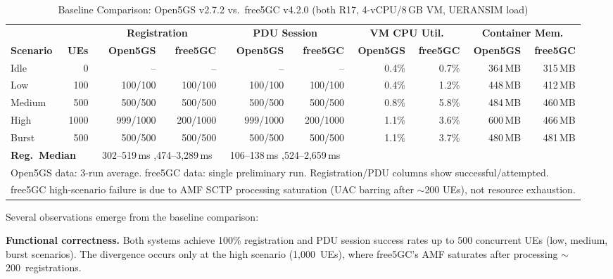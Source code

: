 \documentclass[conference]{IEEEtran}
\begin{document}
\begin{table}[t]
\centering
\caption{Baseline Comparison: Open5GS v2.7.2 vs.\ free5GC v4.2.0 (both R17, 4-vCPU/8\,GB VM, UERANSIM load)}
\label{tab:baseline-resources}
\footnotesize
\begin{tabular}{@{}l r rr rr rr rr@{}}
\toprule
 & & \multicolumn{2}{c}{\textbf{Registration}} & \multicolumn{2}{c}{\textbf{PDU Session}} & \multicolumn{2}{c}{\textbf{VM CPU Util.}} & \multicolumn{2}{c}{\textbf{Container Mem.}} \\
\cmidrule(lr){3-4} \cmidrule(lr){5-6} \cmidrule(lr){7-8} \cmidrule(lr){9-10}
\textbf{Scenario} & \textbf{UEs} & \textbf{Open5GS} & \textbf{free5GC} & \textbf{Open5GS} & \textbf{free5GC} & \textbf{Open5GS} & \textbf{free5GC} & \textbf{Open5GS} & \textbf{free5GC} \\
\midrule
Idle   & 0    & --         & --         & --         & --         & 0.4\%  & 0.7\%  & 364\,MB  & 315\,MB  \\
Low    & 100  & 100/100    & 100/100    & 100/100    & 100/100    & 0.4\%  & 1.2\%  & 448\,MB  & 412\,MB  \\
Medium & 500  & 500/500    & 500/500    & 500/500    & 500/500    & 0.8\%  & 5.8\%  & 484\,MB  & 460\,MB  \\
High   & 1000 & 999/1000   & 200/1000   & 999/1000   & 200/1000   & 1.1\%  & 3.6\%  & 600\,MB  & 466\,MB  \\
Burst  & 500  & 500/500    & 500/500    & 500/500    & 500/500    & 1.1\%  & 3.7\%  & 480\,MB  & 481\,MB  \\
\midrule
\multicolumn{2}{l}{\textbf{Reg.\ Median}} & \multicolumn{2}{c}{302--519\,ms \quad 2,474--3,289\,ms} & \multicolumn{2}{c}{106--138\,ms \quad 1,524--2,659\,ms} & \multicolumn{4}{c}{} \\
\bottomrule
\multicolumn{10}{l}{\scriptsize Open5GS data: 3-run average. free5GC data: single preliminary run. Registration/PDU columns show successful/attempted.} \\
\multicolumn{10}{l}{\scriptsize free5GC high-scenario failure is due to AMF SCTP processing saturation (UAC barring after $\sim$200 UEs), not resource exhaustion.}
\end{tabular}
\end{table}

Several observations emerge from the baseline comparison:

\textbf{Functional correctness.} Both systems achieve 100\% registration and PDU session success rates up to 500 concurrent UEs (low, medium, burst scenarios). The divergence occurs only at the high scenario (1,000~UEs), where free5GC's AMF saturates after processing $\sim$200~registrations.
\end{document}
